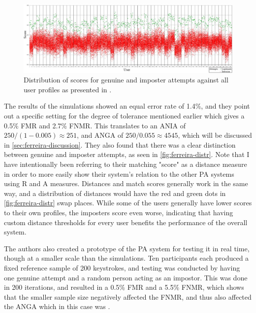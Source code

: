 \documentclass[informationsecurity]{gucmasterproject}
\begin{document}
\begin{figure}[h]
    \centering
    \includegraphics[width=1\textwidth]{ferreira/distr}
    \caption{Distribution of scores for genuine and imposter attempts against all user profiles as presented in \cite{superResults}.}
    \label{fig:ferreira-distr}
\end{figure}

The results of the simulations showed an equal error rate of 1.4\%, and they point out a specific setting for the degree of tolerance mentioned earlier which gives a 0.5\% FMR and 2.7\% FNMR.
This translates to an ANIA of $250 / (1-0.005) \approx{251}$, and ANGA of $250 / 0.055 \approx{4545}$, which will be discussed in \autoref{sec:ferreira-discussion}.
They also found that there was a clear distinction between genuine and imposter attempts, as seen in \autoref{fig:ferreira-distr}.
Note that I have intentionally been referring to their matching "score" as a distance measure in order to more easily show their system's relation to the other PA systems using R and A measures. 
Distances and match scores generally work in the same way, and a distribution of distances would have the red and green dots in \autoref{fig:ferreira-distr} swap places.
While some of the users generally have lower scores to their own profiles, the imposters score even worse, indicating that having custom distance thresholds for every user benefits the performance of the overall system.

The authors also created a prototype of the PA system for testing it in real time, though at a smaller scale than the simulations.
Ten participants each produced a fixed reference sample of 200 keystrokes, and testing was conducted by having one genuine attempt and a random person acting as an impostor. This was done in 200 iterations, and resulted in a 0.5\% FMR and a 5.5\% FNMR, which shows that the smaller sample size negatively affected the FNMR, and thus also affected the ANGA which in this case was .
\end{document}
